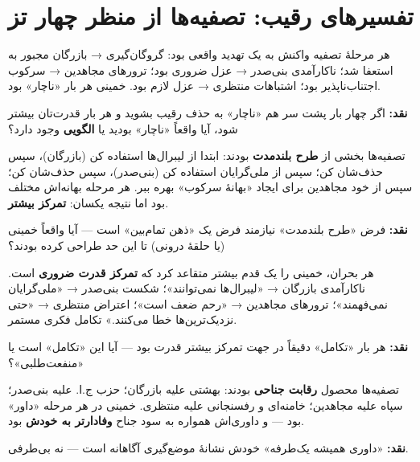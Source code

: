 \documentclass[12pt,a4paper]{book}
\newcommand{\keyword}[1]{\textbf{\textcolor{cPrimary}{#1}}}
\begin{document}
\section{تفسیرهای رقیب: تصفیه‌ها از منظر چهار تز}

\begin{principleBox}
\begin{description}[style=nextline, font=\bfseries\color{cPrimary}]
    \item[تز ۱ (صداقت + اجبار)]
    هر مرحلهٔ تصفیه واکنش به یک تهدید واقعی بود: گروگان‌گیری → بازرگان مجبور به استعفا شد؛ ناکارآمدی بنی‌صدر → عزل ضروری بود؛ ترورهای مجاهدین → سرکوب اجتناب‌ناپذیر بود؛ اشتباهات منتظری → عزل لازم بود. خمینی هر بار «ناچار» بود.

    \textbf{نقد:} اگر چهار بار پشت سر هم «ناچار» به حذف رقیب بشوید و هر بار قدرت‌تان بیشتر شود، آیا واقعاً «ناچار» بودید یا \keyword{الگویی} وجود دارد؟

    \item[تز ۲ (خدعه)]
    تصفیه‌ها بخشی از \keyword{طرح بلندمدت} بودند: ابتدا از لیبرال‌ها استفاده کن (بازرگان)، سپس حذف‌شان کن؛ سپس از ملی‌گرایان استفاده کن (بنی‌صدر)، سپس حذف‌شان کن؛ سپس از خود مجاهدین برای ایجاد «بهانهٔ سرکوب» بهره ببر. هر مرحله بهانه‌اش مختلف بود اما نتیجه یکسان: \keyword{تمرکز بیشتر}.

    \textbf{نقد:} فرض «طرح بلندمدت» نیازمند فرض یک «ذهن تمام‌بین» است — آیا واقعاً خمینی (یا حلقهٔ درونی) تا این حد طراحی کرده بودند؟

    \item[تز ۳ (تکامل)]
    هر بحران، خمینی را یک قدم بیشتر متقاعد کرد که \keyword{تمرکز قدرت ضروری} است. ناکارآمدی بازرگان → «لیبرال‌ها نمی‌توانند»؛ شکست بنی‌صدر → «ملی‌گرایان نمی‌فهمند»؛ ترورهای مجاهدین → «رحم ضعف است»؛ اعتراض منتظری → «حتی نزدیک‌ترین‌ها خطا می‌کنند.» تکامل فکری مستمر.

    \textbf{نقد:} هر بار «تکامل» دقیقاً در جهت تمرکز بیشتر قدرت بود — آیا این «تکامل» است یا «منفعت‌طلبی»؟

    \item[تز ۴ (فشار نخبگان)]
    تصفیه‌ها محصول \keyword{رقابت جناحی} بودند: بهشتی علیه بازرگان؛ حزب ج.ا. علیه بنی‌صدر؛ سپاه علیه مجاهدین؛ خامنه‌ای و رفسنجانی علیه منتظری. خمینی در هر مرحله «داور» بود — و داوری‌اش همواره به سود جناح \keyword{وفادارتر به خودش} بود.

    \textbf{نقد:} «داوری همیشه یک‌طرفه» خودش نشانهٔ موضع‌گیری آگاهانه است — نه بی‌طرفی.
\end{description}
\end{principleBox}
\end{document}
